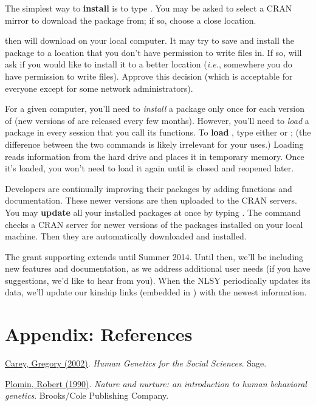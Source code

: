 \documentclass{article}\usepackage[]{graphicx}\usepackage[]{color}
\begin{document}
The simplest way to \textbf{install}  is to type
.  You may be asked to select a CRAN
mirror to download the package from; if so, choose a close location.

\R{} then will download  on your local computer.  It may
try to save and install the package to a location that you don't have permission to
write files in.  If so, \R{} will ask if you would like to install it to a
better location (\emph{i.e.}, somewhere you do have permission to write files). 
Approve this decision (which is acceptable for everyone except for some network
administrators).

For a given computer, you'll need to \emph{install} a package only once for each
version of \R{} (new versions of \R{} are released every few months).  However, you'll need to \emph{load} a package in
every session that you call its functions.  To \textbf{load} ,
type either  or ; (the
difference between the two commands is likely irrelevant for your uses.) 
Loading reads  information from the hard drive and places it in
temporary memory.  Once it's loaded, you won't need to load it again until \R{}
is closed and reopened later.

Developers are continually improving their packages by adding functions and
documentation.  These newer versions are then uploaded to the CRAN servers.  You
may \textbf{update} all your installed packages at once by typing
.  The command checks a CRAN server for
newer versions of the packages installed on your local machine.  Then they are
automatically downloaded and installed. 

The grant supporting  extends until Summer 2014.  Until then,
we'll be including new features and documentation, as we address additional user
needs (if you have suggestions, we'd like to hear from you).  When the NLSY periodically updates its data, we'll
update our kinship links (embedded in ) with the newest information.
\section{Appendix: References} \label{sec:References}
\href{http://psych.colorado.edu/~carey/hgss/}{Carey, Gregory (2002)}. \emph{Human Genetics for the Social Sciences}. Sage.

\href{http://books.google.com/books?id=r7AgAQAAIAAJ&source=gbs_navlinks_s}{Plomin, Robert (1990)}. \emph{Nature and nurture: an introduction to human behavioral genetics}.  Brooks/Cole Publishing Company.
\end{document}
